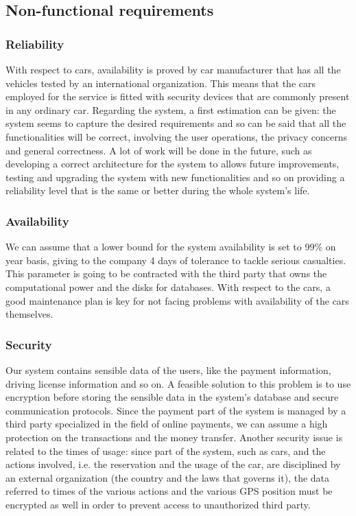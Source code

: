 \documentclass[10pt, a4paper,titlepage]{article}
\begin{document}
\subsection{Non-functional requirements}
\subsubsection{Reliability} 
With respect to cars, availability is proved by car manufacturer that has all the vehicles tested by an international organization. This means that the cars employed for the service is fitted with security devices that are commonly present in any ordinary car. Regarding the system, a first estimation can be given: the system seems to capture the desired requirements and so can be said that all the functionalities will be correct, involving the user operations, the privacy concerns and general correctness. A lot of work will be done in the future, such as developing a correct architecture for the system to allows future improvements, testing and upgrading the system with new functionalities and so on providing a reliability level that is the same or better during the whole system's life.
\subsubsection{Availability}
We can assume that a lower bound for the system availability is set to 99\% on year basis, giving to the company 4 days of tolerance to tackle serious casualties. This parameter is going to be contracted with the third party that owns the computational power and the disks for databases. With respect to the cars, a good maintenance plan is key for not facing problems with availability of the cars themselves.
\subsubsection{Security}
Our system contains sensible data of the users, like the payment information, driving license information and so on. A feasible solution to this problem is to use encryption before storing the sensible data in the system's database and secure communication protocols. Since the payment part of the system is managed by a third party specialized in the field of online payments, we can assume a high protection on the transactions and the money transfer. Another security issue is related to the times of usage: since part of the system, such as cars, and the actions involved, i.e. the reservation and the usage of the car, are disciplined by an external organization (the country and the laws that governs it), the data referred to times of the various actions and the various GPS position must be encrypted as well in order to prevent access to unauthorized third party.
\end{document}
